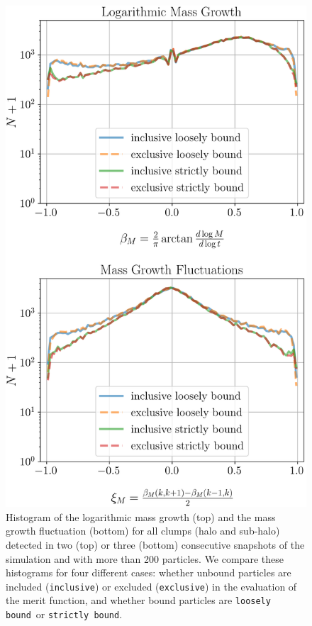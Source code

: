 \documentclass[a4paper,twocolumn,fleqn,usenatbib]{mnras}
\newcommand{\exc}{\texttt{exclusive}}
\newcommand{\inc}{\texttt{inclusive}}
\newcommand{\sad}{\texttt{strictly bound}}
\newcommand{\nosad}{\texttt{loosely bound}}
\begin{document}
\begin{figure}
  \centering
  \includegraphics[width=.9\linewidth, keepaspectratio]{images/tree-statistics-my-threshold/mass-statistics-inc-excl.png}%
  \caption{Histogram of the logarithmic mass growth (top) and the mass
    growth fluctuation (bottom) for all clumps (halo and sub-halo)
    detected in two (top) or three (bottom) consecutive snapshots of
    the simulation and with more than 200 particles. We compare these
    histograms for four different cases: whether unbound particles are
    included (\inc) or excluded (\exc) in the evaluation of the merit
    function, and whether bound particles are \nosad\ or \sad.
  }%
  \label{fig:saddle_nosaddle_masses}
\end{figure}
\end{document}

